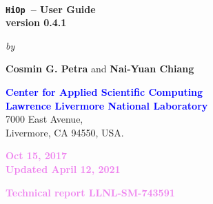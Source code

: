\documentclass[11pt]{article}
\newcommand{\Hi}{\texttt{HiOp}\xspace}
\begin{document}

\begin{titlepage}



\begin{center}
\ 
\vspace{3cm}

  {\huge\bfseries \Hi\ -- User Guide} \\[14pt]
  {\large\bfseries version 0.4.1}

\vspace{3cm}

{\large\emph{by}}

\vspace{1.25cm}

 {\Large\bfseries Cosmin G. Petra} and {\Large\bfseries Nai-Yuan Chiang}
 
\vspace{1.1cm}

{\bfseries\Large{\textcolor{blue}{Center for Applied Scientific Computing\\
Lawrence Livermore National Laboratory}}}\\[10pt]


{\Large{7000 East Avenue, \\Livermore, CA 94550, USA.}}


\vspace{4.75cm}

 \textcolor{violet}{{\large\bfseries Oct 15, 2017} \\
{\large\bfseries Updated April 12, 2021}}

\vspace{0.75cm}

{\Large\bfseries \textcolor{violet}{Technical report LLNL-SM-743591}}





\end{center}
\end{titlepage}

\newpage

 \ 
 
\bigskip

\bigskip


\end{document}
